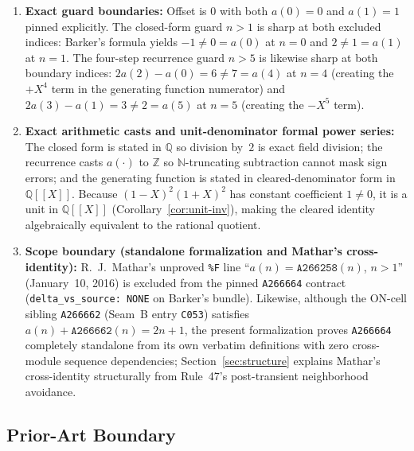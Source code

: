 \documentclass[11pt]{article}
\newcommand{\llbracket}{[\![}
\newcommand{\rrbracket}{]\!]}
\theoremstyle{definition}
\newcommand{\N}{\mathbb{N}}
\newcommand{\Z}{\mathbb{Z}}
\newcommand{\Q}{\mathbb{Q}}
\newcommand{\seq}[1]{\texttt{#1}}
\begin{document}
\begin{enumerate}
\item \textbf{Exact guard boundaries:} Offset is $0$ with both $a(0) = 0$ and $a(1) = 1$ pinned explicitly. The closed-form guard $n > 1$ is sharp at both excluded indices: Barker's formula yields $-1 \ne 0 = a(0)$ at $n = 0$ and $2 \ne 1 = a(1)$ at $n = 1$. The four-step recurrence guard $n > 5$ is likewise sharp at both boundary indices: $2a(2) - a(0) = 6 \ne 7 = a(4)$ at $n = 4$ (creating the $+X^4$ term in the generating function numerator) and $2a(3) - a(1) = 3 \ne 2 = a(5)$ at $n = 5$ (creating the $-X^5$ term).
\item \textbf{Exact arithmetic casts and unit-denominator formal power series:} The closed form is stated in $\Q$ so division by~$2$ is exact field division; the recurrence casts $a(\cdot)$ to $\Z$ so $\N$-truncating subtraction cannot mask sign errors; and the generating function is stated in cleared-denominator form in $\Q\llbracket X \rrbracket$. Because $(1 - X)^2(1 + X)^2$ has constant coefficient $1 \ne 0$, it is a unit in $\Q\llbracket X \rrbracket$ (Corollary~\ref{cor:unit-inv}), making the cleared identity algebraically equivalent to the rational quotient.
\item \textbf{Scope boundary (standalone formalization and Mathar's cross-identity):} R.~J.\ Mathar's unproved \texttt{\%F} line ``$a(n) = \seq{A266258}(n)$, $n > 1$'' (January~10, 2016) is excluded from the pinned \seq{A266664} contract (\texttt{delta\_vs\_source: NONE} on Barker's bundle). Likewise, although the ON-cell sibling \seq{A266662} (Seam~B entry \texttt{C053}) satisfies $a(n) + \seq{A266662}(n) = 2n + 1$, the present formalization proves \seq{A266664} completely standalone from its own verbatim definitions with zero cross-module sequence dependencies; Section~\ref{sec:structure} explains Mathar's cross-identity structurally from Rule~47's post-transient neighborhood avoidance.
\end{enumerate}

\subsection{Prior-Art Boundary}
\label{sec:prior-art}
\end{document}
